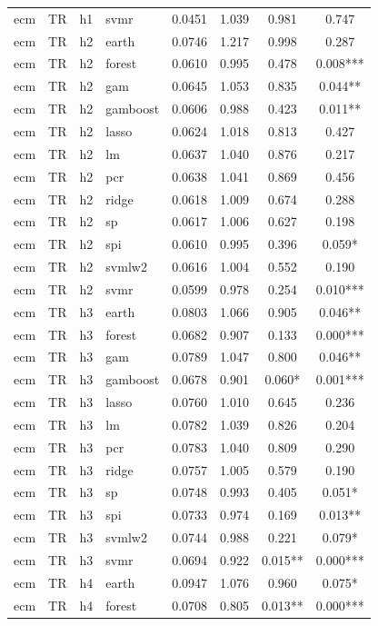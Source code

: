 \begin{ThreePartTable}
\begin{longtable}[t]{llclcccc}
ecm & TR & h1 & svmr & 0.0451 & 1.039 & 0.981 & 0.747\\
\addlinespace
ecm & TR & h2 & earth & 0.0746 & 1.217 & 0.998 & 0.287\\
ecm & TR & h2 & forest & 0.0610 & 0.995 & 0.478 & 0.008***\\
ecm & TR & h2 & gam & 0.0645 & 1.053 & 0.835 & 0.044**\\
ecm & TR & h2 & gamboost & 0.0606 & 0.988 & 0.423 & 0.011**\\
ecm & TR & h2 & lasso & 0.0624 & 1.018 & 0.813 & 0.427\\
ecm & TR & h2 & lm & 0.0637 & 1.040 & 0.876 & 0.217\\
ecm & TR & h2 & pcr & 0.0638 & 1.041 & 0.869 & 0.456\\
ecm & TR & h2 & ridge & 0.0618 & 1.009 & 0.674 & 0.288\\
ecm & TR & h2 & sp & 0.0617 & 1.006 & 0.627 & 0.198\\
ecm & TR & h2 & spi & 0.0610 & 0.995 & 0.396 & 0.059*\\
ecm & TR & h2 & svmlw2 & 0.0616 & 1.004 & 0.552 & 0.190\\
ecm & TR & h2 & svmr & 0.0599 & 0.978 & 0.254 & 0.010***\\
\addlinespace
ecm & TR & h3 & earth & 0.0803 & 1.066 & 0.905 & 0.046**\\
ecm & TR & h3 & forest & 0.0682 & 0.907 & 0.133 & 0.000***\\
ecm & TR & h3 & gam & 0.0789 & 1.047 & 0.800 & 0.046**\\
ecm & TR & h3 & gamboost & 0.0678 & 0.901 & 0.060* & 0.001***\\
ecm & TR & h3 & lasso & 0.0760 & 1.010 & 0.645 & 0.236\\
ecm & TR & h3 & lm & 0.0782 & 1.039 & 0.826 & 0.204\\
ecm & TR & h3 & pcr & 0.0783 & 1.040 & 0.809 & 0.290\\
ecm & TR & h3 & ridge & 0.0757 & 1.005 & 0.579 & 0.190\\
ecm & TR & h3 & sp & 0.0748 & 0.993 & 0.405 & 0.051*\\
ecm & TR & h3 & spi & 0.0733 & 0.974 & 0.169 & 0.013**\\
ecm & TR & h3 & svmlw2 & 0.0744 & 0.988 & 0.221 & 0.079*\\
ecm & TR & h3 & svmr & 0.0694 & 0.922 & 0.015** & 0.000***\\
\addlinespace
ecm & TR & h4 & earth & 0.0947 & 1.076 & 0.960 & 0.075*\\
ecm & TR & h4 & forest & 0.0708 & 0.805 & 0.013** & 0.000***\\

\end{longtable}
\end{ThreePartTable}
